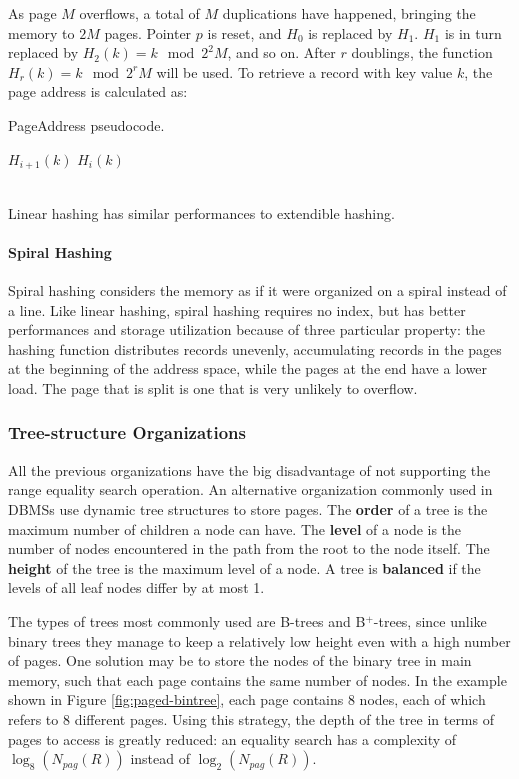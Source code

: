 As page $M$ overflows, a total of $M$ duplications have happened, bringing the memory to $2M$ pages. Pointer $p$ is reset, and $H_0$ is replaced by $H_1$. $H_1$ is in turn replaced by $H_2(k) = k \mod 2^2 M$, and so on. After $r$ doublings, the function $H_r(k) = k \mod 2^r M$ will be used. To retrieve a record with key value $k$, the page address is calculated as:
\begin{algorithm}
\caption{PageAddress pseudocode.}
\begin{algorithmic}[1]
        \State $H_{i+1}(k)$
    \Else  
        \State $H_i(k)$
    \EndIf
\end{algorithmic}
\end{algorithm}
\\Linear hashing has similar performances to extendible hashing.

\paragraph{Spiral Hashing}

Spiral hashing considers the memory as if it were organized on a spiral instead of a line. Like linear hashing, spiral hashing requires no index, but has better performances and storage utilization because of three particular property:
the hashing function distributes records unevenly, accumulating records in the pages at the beginning of the address space, while the pages at the end have a lower load. The page that is split is one that is very unlikely to overflow.

\subsubsection{Tree-structure Organizations}

All the previous organizations have the big disadvantage of not supporting the range equality search operation. An alternative organization commonly used in DBMSs use dynamic tree structures to store pages. The \textbf{order} of a tree is the maximum number of children a node can have. The \textbf{level} of a node is the number of nodes encountered in the path from the root to the node itself. The \textbf{height} of the tree is the maximum level of a node. A tree is \textbf{balanced} if the levels of all leaf nodes differ by at most 1.

The types of trees most commonly used are B-trees and B$^+$-trees, since unlike binary trees they manage to keep a relatively low height even with a high number of pages. One solution may be to store the nodes of the binary tree in main memory, such that each page contains the same number of nodes. In the example shown in Figure \ref{fig:paged-bintree}, each page contains 8 nodes, each of which refers to 8 different pages. Using this strategy, the depth of the tree in terms of pages to access is greatly reduced: an equality search has a complexity of $\log_8 (N_{pag}(R))$ instead of $\log_2 (N_{pag}(R))$.

